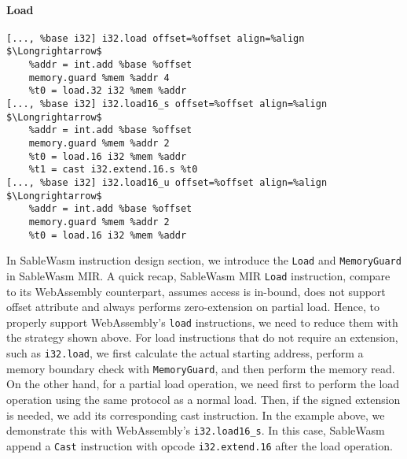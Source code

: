 \paragraph{Load} \quad
\begin{lstlisting}[basicstyle=\linespread{1}\small\ttfamily, language=SableWasmMIR, mathescape=true]
[..., %base i32] i32.load offset=%offset align=%align $\Longrightarrow$
    %addr = int.add %base %offset
    memory.guard %mem %addr 4
    %t0 = load.32 i32 %mem %addr
[..., %base i32] i32.load16_s offset=%offset align=%align $\Longrightarrow$
    %addr = int.add %base %offset
    memory.guard %mem %addr 2
    %t0 = load.16 i32 %mem %addr
    %t1 = cast i32.extend.16.s %t0
[..., %base i32] i32.load16_u offset=%offset align=%align $\Longrightarrow$
    %addr = int.add %base %offset
    memory.guard %mem %addr 2
    %t0 = load.16 i32 %mem %addr
\end{lstlisting}
In SableWasm instruction design section, we introduce the \texttt{Load} and \texttt{MemoryGuard} in SableWasm MIR. A quick recap, SableWasm MIR \texttt{Load} instruction, compare to its WebAssembly counterpart, assumes access is in-bound, does not support offset attribute and always performs zero-extension on partial load. Hence, to properly support WebAssembly's \texttt{load} instructions, we need to reduce them with the strategy shown above. For load instructions that do not require an extension, such as \texttt{i32.load}, we first calculate the actual starting address, perform a memory boundary check with \texttt{MemoryGuard}, and then perform the memory read. On the other hand, for a partial load operation, we need first to perform the load operation using the same protocol as a normal load. Then, if the signed extension is needed, we add its corresponding cast instruction. In the example above, we demonstrate this with WebAssembly's \texttt{i32.load16\_s}. In this case, SableWasm append a \texttt{Cast} instruction with opcode \texttt{i32.extend.16} after the load operation.

